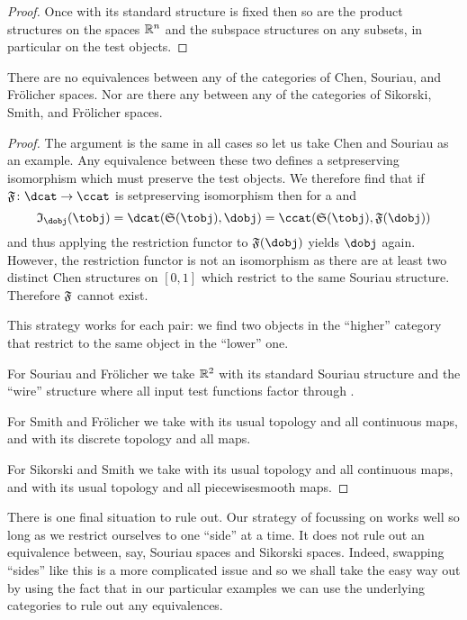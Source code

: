 \documentclass[%
12pt,%
arxiv,%
defaults
]{myclass}
\begin{document}
\begin{proof}
Once \R with its standard structure is fixed then so are the product structures on the spaces \(\mathbb{R}^n\) and the subspace structures on any subsets, in particular on the test objects.
\end{proof}

\begin{corollary}
There are no equivalences between any of the categories of Chen, Souriau, and Fr\"olicher spaces.
Nor are there any between any of the categories of Sikorski, Smith, and Fr\"olicher spaces.
\end{corollary}

\begin{proof}
The argument is the same in all cases so let us take Chen and Souriau as an example.
Any equivalence between these two defines a set\enhyp{}preserving isomorphism which must preserve the test objects.
We therefore find that if \(\func{F} \colon \dcat \to \ccat\) is set\enhyp{}preserving isomorphism then for a \dobj[\dobj] and \tobj[\tobj]
%
\[
  \itest_{\dobj}(\tobj) = \Hom{\dcat}{\sfunc(\tobj)}{\dobj} = \Hom{\ccat}{\sfunc(\tobj)}{\func{F}(\dobj)}
\]
%
and thus applying the restriction functor to \(\func{F}(\dobj)\) yields \(\dobj\) again.
However, the restriction functor is not an isomorphism as there are at least two distinct Chen structures on \([0,1]\) which restrict to the same Souriau structure.
Therefore \(\func{F}\) cannot exist.

This strategy works for each pair: we find two objects in the ``higher'' category that restrict to the same object in the ``lower'' one.

For Souriau and Fr\"olicher we take \(\mathbb{R}^2\) with its standard Souriau structure and the ``wire'' structure where all input test functions factor through \R.

For Smith and Fr\"olicher we take \R with its usual topology and all continuous maps, and \R with its discrete topology and all maps.

For Sikorski and Smith we take \R with its usual topology and all continuous maps, and \R with its usual topology and all piecewise\enhyp{}smooth maps.
\end{proof}

There is one final situation to rule out.
Our strategy of focussing on \R works well so long as we restrict ourselves to one ``side'' at a time.
It does not rule out an equivalence between, say, Souriau spaces and Sikorski spaces.
Indeed, swapping ``sides'' like this is a more complicated issue and so we shall take the easy way out by using the fact that in our particular examples we can use the underlying categories to rule out any equivalences.
\end{document}
